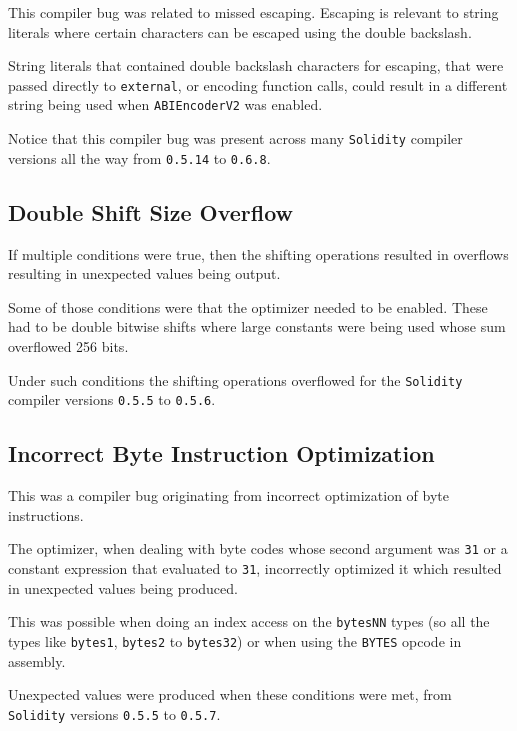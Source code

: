 This compiler bug was related to missed escaping. Escaping is relevant
to string literals where certain characters can be escaped using the
double backslash.

String literals that contained double backslash characters for escaping,
that were passed directly to \texttt{external}, or encoding function
calls, could result in a different string being used when
\texttt{ABIEncoderV2} was enabled.

Notice that this compiler bug was present across many \texttt{Solidity}
compiler versions all the way from \texttt{0.5.14} to \texttt{0.6.8}.

\subsection{Double Shift Size
Overflow}\label{double-shift-size-overflow}

If multiple conditions were true, then the shifting operations resulted
in overflows resulting in unexpected values being output.

Some of those conditions were that the optimizer needed to be enabled.
These had to be double bitwise shifts where large constants were being
used whose sum overflowed 256 bits.

Under such conditions the shifting operations overflowed for the
\texttt{Solidity} compiler versions \texttt{0.5.5} to \texttt{0.5.6}.

\subsection{Incorrect Byte Instruction
Optimization}\label{incorrect-byte-instruction-optimization}

This was a compiler bug originating from incorrect optimization of byte
instructions.

The optimizer, when dealing with byte codes whose second argument was
\texttt{31} or a constant expression that evaluated to \texttt{31},
incorrectly optimized it which resulted in unexpected values being
produced.

This was possible when doing an index access on the \texttt{bytesNN}
types (so all the types like \texttt{bytes1}, \texttt{bytes2} to
\texttt{bytes32}) or when using the \texttt{BYTES} opcode in assembly.

Unexpected values were produced when these conditions were met, from
\texttt{Solidity} versions \texttt{0.5.5} to \texttt{0.5.7}.

